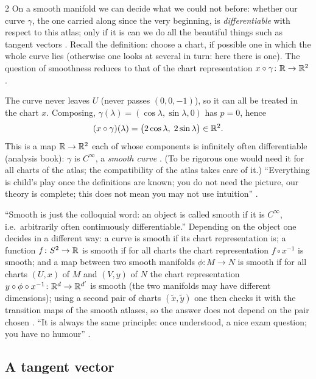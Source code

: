 \begin{paracol}{2}
On a smooth manifold we can decide what we could not before: whether our curve $\gamma$, the one carried along since the very beginning, is
\emph{differentiable} with respect to this atlas; only if it is can we do all the beautiful things such as tangent vectors .
Recall the definition: choose a chart, if possible one in which the whole curve lies (otherwise one looks at several in turn: here there is
one). The question of smoothness reduces to that of the chart representation $x\circ\gamma\colon\mathbb{R}\to\mathbb{R}^2$.
\begin{example}\label{ex:sp-smooth-curve}
The curve never leaves $U$ (never passes $(0,0,-1)$), so it can all be treated in the chart $x$. Composing, $\gamma(\lambda)=(\cos\lambda,\sin\lambda,0)$ has $p=0$, hence
\[
  (x\circ\gamma)(\lambda)=\bigl(2\cos\lambda,\;2\sin\lambda\bigr)\in\mathbb{R}^2 .
\]
This is a map $\mathbb{R}\to\mathbb{R}^2$ each of whose components is infinitely often differentiable (analysis book): $\gamma$ is $C^\infty$, a \emph{smooth curve}
. (To be rigorous one would need it for all charts of the atlas; the compatibility of the atlas takes care of it.)
``Everything is child's play once the definitions are known; you do not need the picture, our theory is complete; this does not mean you may not use intuition''
.
\end{example}
``Smooth is just the colloquial word: an object is called smooth if it is $C^\infty$, i.e.\ arbitrarily often continuously differentiable.'' Depending on the object
one decides in a different way: a curve is smooth if its chart representation is; a function $f\colon S^2\to\mathbb{R}$ is smooth if for all charts
the chart representation $f\circ x^{-1}$ is smooth; and a map between two smooth manifolds $\phi\colon M\to N$ is smooth if for all charts $(U,x)$ of $M$
and $(V,y)$ of $N$ the chart representation $y\circ\phi\circ x^{-1}\colon\mathbb{R}^d\to\mathbb{R}^{d'}$ is smooth (the two manifolds may have different
dimensions); using a second pair of charts $(\tilde x,\tilde y)$ one then checks it with the transition maps of the smooth atlases, so the answer
does not depend on the pair chosen . ``It is always the same principle: once understood, a nice exam question; you have no humour''
.

\subsection{A tangent vector}


\end{paracol}
